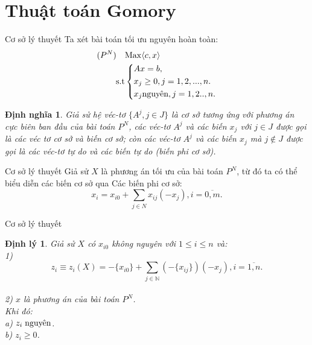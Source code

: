 \documentclass[10pt]{beamer}
\newtheorem{dn}{Định nghĩa}[section]
\newtheorem{dl}{Định lý}[section]
\begin{document}
\section*{Thuật toán Gomory}
    \begin{frame}{Cơ sở lý thuyết}
        Ta xét bài toán tối ưu nguyên hoàn toàn:\\
\begin{equation}\label{Gomory1}
     \begin{split}
      (P^N) \quad    & {\rm{Max}} \langle c,x \rangle\\
          \rm{s.t} &\left\{\begin{split}
            & Ax= b,\\
           & x_j \ge 0, j=1,2,...,n.\\
            & x_j \text{nguyên}, j=1,2..,n.\\
           \end{split}\right.
       \end{split}
   \end{equation}
   \begin{dn}
     Giả  sử hệ véc-tơ $\{A^j,j\in J\}$ là cơ sở tương ứng với phương án cực biên ban đầu của bài toán $P^N$, các véc-tơ $A^j$ và các biến $x_j$ với $j\in J$ được gọi là các véc tơ cơ sở và biến cơ sở; còn các véc-tơ $A^j$ và các biến $x_j$ mà $j \notin J$ được gọi là các véc-tơ tự do và các biến tự do (biến phi cơ sở).\\  
   \end{dn}
    \end{frame}

    \begin{frame}{Cơ sở lý thuyết}
         Giả sử $X$ là phương án  tối ưu của bài toán $P^N$, từ đó ta có thể biểu diễn các biến cơ sở qua Các biến phi cơ sở:\\
   \begin{equation}\label{2.4}
       x_{i}=x_{i0} + \sum_{j \in N} x_{ij}(-x_j), i=\overline{0,m}.
   \end{equation}
    \end{frame}

    \begin{frame}{Cơ sở lý thuyết}
        \begin{dl}
        Giả sử $X$ có $x_{i0}$ không nguyên với $1\le i\le n$ và:\\
        1)\begin{equation}\label{2.5}
            z_i\equiv z_i(X)= -\{x_{i0}\} + \sum_{j \in \mathbb {N} }(-\{x_{ij}\})(-x_{j}), i=\overline{1,n}.
        \end{equation} \\
        2) $x$ là phương án của bài toán $P^N$.\\
        Khi đó:\\
        a) $z_i \hspace{0.1cm} \text{nguyên}$.\\
        b) $z_i \ge 0$. 
        \end{dl}
    \end{frame}
\end{document}
